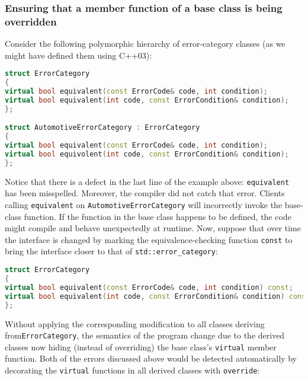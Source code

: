 \subsubsection[Ensuring that a member function of a base class is being overridden]{Ensuring that a member function of a base class is being overridden}\label{ensuring-that-a-member-function-of-a-base-class-is-being-overridden}

Consider the following polymorphic hierarchy of error-category classes
(as we might have defined them using C++03):

\begin{lstlisting}[language=C++]
struct ErrorCategory
{
virtual bool equivalent(const ErrorCode& code, int condition);
virtual bool equivalent(int code, const ErrorCondition& condition);
};

struct AutomotiveErrorCategory : ErrorCategory
{
virtual bool equivalent(const ErrorCode& code, int condition);
virtual bool equivolent(int code, const ErrorCondition& condition);
};
\end{lstlisting}

\noindent Notice that there is a defect in the last line of the example above:
\texttt{equivalent} has been misspelled. Moreover, the compiler did not
catch that error. Clients calling \texttt{equivalent} on
\texttt{AutomotiveErrorCategory} will incorrectly invoke the base-class
function. If the function in the base class happens to be defined, the
code might compile and behave unexpectedly at runtime. Now, suppose
that over time the interface is changed by marking the
equivalence-checking function \texttt{const} to bring the interface
closer to that of \texttt{std::error\_category}:

\begin{lstlisting}[language=C++]
struct ErrorCategory
{
virtual bool equivalent(const ErrorCode& code, int condition) const;
virtual bool equivalent(int code, const ErrorCondition& condition) const;
};
\end{lstlisting}

Without applying the corresponding modification to all classes deriving
from\linebreak[4] \texttt{ErrorCategory}, the semantics of the program change due to
the derived classes now hiding (instead of overriding) the base class's
\texttt{virtual} member function. Both of the errors discussed above
would be detected automatically by decorating the \texttt{virtual}
functions in all derived classes with \texttt{override}:

